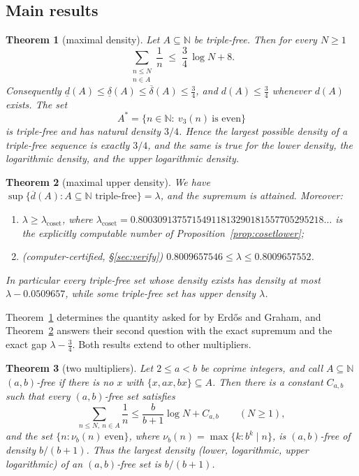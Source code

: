 \documentclass[11pt]{amsart}
\newtheorem{theorem}{Theorem}[section]
\theoremstyle{definition}
\newcommand{\N}{\mathbb{N}}
\newcommand{\dlow}{\underline{d}}
\newcommand{\dup}{\overline{d}}
\newcommand{\llow}{\underline{\delta}}
\newcommand{\lup}{\overline{\delta}}
\newcommand{\lamc}{\lambda_{\mathrm{coset}}}
\begin{document}
\subsection{Main results}

\begin{theorem}[maximal density]\label{thm:main}
Let $A\subseteq\N$ be triple-free. Then for every $N\ge1$
\begin{equation}\label{eq:main}
\sum_{\substack{n\le N\\ n\in A}}\frac1n\;\le\;\frac34\,\log N+8 .
\end{equation}
Consequently $\dlow(A)\le\llow(A)\le\lup(A)\le\tfrac34$, and $d(A)\le\tfrac34$ whenever $d(A)$ exists. The set
\[
A^\ast=\{n\in\N:\ v_3(n)\ \text{is even}\}
\]
is triple-free and has natural density $3/4$. Hence the largest possible density of a triple-free sequence is exactly $3/4$, and the same is true for the lower density, the logarithmic density, and the upper logarithmic density.
\end{theorem}

\begin{theorem}[maximal upper density]\label{thm:upper}
We have $\sup\{\dup(A): A\subseteq\N\text{ triple-free}\}=\lambda$, and the supremum is attained. Moreover:
\begin{enumerate}[label=\textup{(\roman*)}]
\item $\lambda\ge\lamc$, where $\lamc=0.80030913757154911813290181557705295218\ldots$ is the explicitly computable number of Proposition~\ref{prop:cosetlower};
\item \textup{(computer-certified, \S\ref{sec:verify})} $0.8009657546\le\lambda\le 0.8009657552$.
\end{enumerate}
In particular every triple-free set whose density exists has density at most $\lambda-0.0509657$, while some triple-free set has upper density $\lambda$.
\end{theorem}

Theorem~\ref{thm:main} determines the quantity asked for by Erd\H{o}s and Graham, and Theorem~\ref{thm:upper} answers their second question with the exact supremum and the exact gap $\lambda-\tfrac34$. Both results extend to other multipliers.

\begin{theorem}[two multipliers]\label{thm:pairs}
Let $2\le a<b$ be coprime integers, and call $A\subseteq\N$ \emph{$(a,b)$-free} if there is no $x$ with $\{x,ax,bx\}\subseteq A$. Then there is a constant $C_{a,b}$ such that every $(a,b)$-free set satisfies
\[
\sum_{n\le N,\ n\in A}\frac1n\le\frac{b}{b+1}\log N+C_{a,b}\qquad(N\ge1),
\]
and the set $\{n: \nu_b(n)\ \text{even}\}$, where $\nu_b(n)=\max\{k: b^k\mid n\}$, is $(a,b)$-free of density $b/(b+1)$. Thus the largest density (lower, logarithmic, upper logarithmic) of an $(a,b)$-free set is $b/(b+1)$.
\end{theorem}
\end{document}
